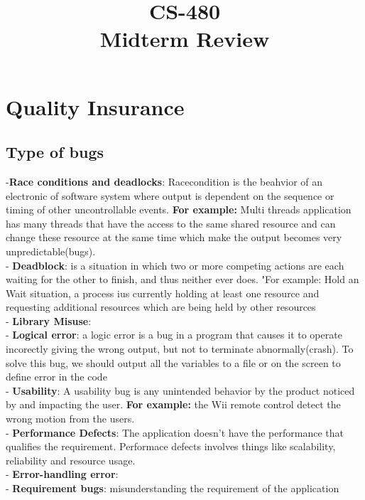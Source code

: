 \documentclass{article}
\title{ CS-480\\ Midterm Review}
\begin{document}
\maketitle

\section{ Quality Insurance}

\subsection{Type of bugs}

-\textbf{Race conditions and deadlocks}: Racecondition is the beahvior
of an electronic of software system where output is dependent on the sequence or timing of other
uncontrollable events. \textbf{For example:} Multi threads application has many
threads that have the access to the same shared resource and can change these resource
at the same time which make the output becomes very unpredictable(bugs).\\
- \textbf{Deadblock}: is a situation in which two or more competing actions are
each waiting for the other to finish, and thus neither ever does. \textbf'{For
example:} Hold an Wait situation, a process ius currently holding at least one
resource and requesting additional resources which are being held by other
resources\\
- \textbf{Library Misuse}:\\
- \textbf{Logical error}:  a logic error is a bug in a program that causes
it to operate incorectly giving the wrong output, but not to terminate
abnormally(crash). To solve this bug, we should output all the variables to a
file or on the screen to define error in the code\\
- \textbf{Usability}: A usability bug is any unintended behavior by the product
noticed by and impacting the user. \textbf{For example:} the Wii remote control
detect the wrong motion from the users.\\
- \textbf{Performance Defects}:	The application doesn't have the performance
that qualifies the requirement. Performace defects involves things like
scalability, reliability and resource usage.\\
- \textbf{Error-handling error}:\\
- \textbf{Requirement bugs}: misunderstanding the requirement of the
application\\
\end{document}
